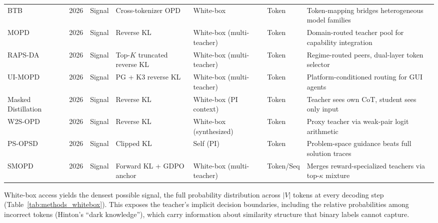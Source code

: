 \documentclass{article} %
\begin{document}
\begin{table}[t]
{\begin{tabular}{@{}lclllll@{}}
        BTB~\citep{2606.09456} & 2026 & Signal & Cross-tokenizer OPD & White-box & Token & Token-mapping bridges heterogeneous model families \\
        MOPD~\citep{2606.30406} & 2026 & Signal & Reverse KL & White-box (multi-teacher) & Token & Domain-routed teacher pool for capability integration \\
        RAPS-DA~\citep{2606.30518} & 2026 & Signal & Top-$K$ truncated reverse KL & White-box (multi-teacher) & Token & Regime-routed peers, dual-layer token selector \\
        UI-MOPD~\citep{2607.04425} & 2026 & Signal & PG + K3 reverse KL & White-box (multi-teacher) & Token & Platform-conditioned routing for GUI agents \\
        Masked Distillation~\citep{2607.22629} & 2026 & Signal & Reverse KL & White-box (PI context) & Token & Teacher sees own CoT, student sees only input \\
        W2S-OPD~\citep{2607.26246} & 2026 & Signal & Reverse KL & White-box (synthesized) & Token & Proxy teacher via weak-pair logit arithmetic \\
        PS-OPSD~\citep{2608.01589} & 2026 & Signal & Clipped KL & Self (PI) & Token & Problem-space guidance beats full solution traces \\
        SMOPD~\citep{2608.03092} & 2026 & Signal & Forward KL + GDPO anchor & White-box (multi-teacher) & Token/Seq & Merges reward-specialized teachers via top-$\kappa$ mixture \\
        \bottomrule
    \end{tabular}
    }
\end{table}

White-box access yields the densest possible signal, the full probability distribution across $|V|$ tokens at every decoding step (Table~\ref{tab:methods_whitebox}). This exposes the teacher's implicit decision boundaries, including the relative probabilities among incorrect tokens (Hinton's ``dark knowledge''), which carry information about similarity structure that binary labels cannot capture.
\end{document}
